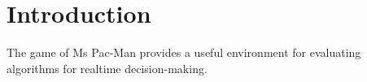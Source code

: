 \chapter{Introduction}
\label{ch:intro}

The game of Ms Pac-Man provides a useful environment for evaluating algorithms for realtime decision-making.
